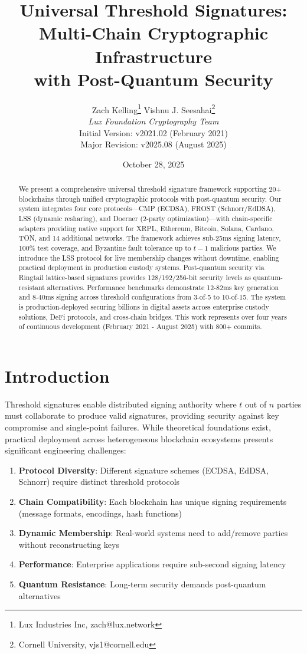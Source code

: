 \documentclass[11pt,twocolumn]{article}
\title{\textbf{Universal Threshold Signatures:\\Multi-Chain Cryptographic Infrastructure\\with Post-Quantum Security}}
\author{
Zach Kelling\thanks{Lux Industries Inc, zach@lux.network} \quad
Vishnu J. Seesahai\thanks{Cornell University, vjs1@cornell.edu} \\[0.5em]
\textit{Lux Foundation Cryptography Team}\\[0.5em]
\small Initial Version: v2021.02 (February 2021)\\
\small Major Revision: v2025.08 (August 2025)
}
\date{\small October 28, 2025}
\begin{document}
\maketitle

\begin{abstract}
We present a comprehensive universal threshold signature framework supporting 20+ blockchains through unified cryptographic protocols with post-quantum security. Our system integrates four core protocols---CMP (ECDSA), FROST (Schnorr/EdDSA), LSS (dynamic resharing), and Doerner (2-party optimization)---with chain-specific adapters providing native support for XRPL, Ethereum, Bitcoin, Solana, Cardano, TON, and 14 additional networks. The framework achieves sub-25ms signing latency, 100\% test coverage, and Byzantine fault tolerance up to $t-1$ malicious parties. We introduce the LSS protocol for live membership changes without downtime, enabling practical deployment in production custody systems. Post-quantum security via Ringtail lattice-based signatures provides 128/192/256-bit security levels as quantum-resistant alternatives. Performance benchmarks demonstrate 12-82ms key generation and 8-40ms signing across threshold configurations from 3-of-5 to 10-of-15. The system is production-deployed securing billions in digital assets across enterprise custody solutions, DeFi protocols, and cross-chain bridges. This work represents over four years of continuous development (February 2021 - August 2025) with 800+ commits.
\end{abstract}

\section{Introduction}

Threshold signatures enable distributed signing authority where $t$ out of $n$ parties must collaborate to produce valid signatures, providing security against key compromise and single-point failures. While theoretical foundations exist, practical deployment across heterogeneous blockchain ecosystems presents significant engineering challenges:

\begin{enumerate}
\item \textbf{Protocol Diversity}: Different signature schemes (ECDSA, EdDSA, Schnorr) require distinct threshold protocols
\item \textbf{Chain Compatibility}: Each blockchain has unique signing requirements (message formats, encodings, hash functions)
\item \textbf{Dynamic Membership}: Real-world systems need to add/remove parties without reconstructing keys
\item \textbf{Performance}: Enterprise applications require sub-second signing latency
\item \textbf{Quantum Resistance}: Long-term security demands post-quantum alternatives
\end{enumerate}
\end{document}

